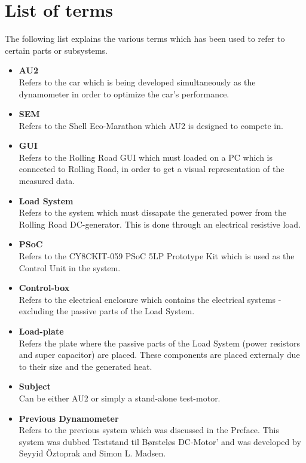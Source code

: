 \section{List of terms}
The following list explains the various terms which has been used to refer to certain parts or subsystems.
\begin{itemize}
	\item \textbf{AU2}\\
	Refers to the car which is being developed simultaneously as the dynamometer in order to optimize the car's performance.
	\item \textbf{SEM}\\
	Refers to the Shell Eco-Marathon which AU2 is designed to compete in.
	\item \textbf{GUI}\\
	Refers to the Rolling Road GUI which must loaded on a PC which is connected to Rolling Road, in order to get a visual representation of the measured data.
	\item \textbf{Load System}\\
	Refers to the system which must dissapate the generated power from the Rolling Road DC-generator. This is done through an electrical resistive load.
	\item \textbf{PSoC}\\
	Refers to the CY8CKIT-059 PSoC 5LP Prototype Kit which is used as the Control Unit in the system.
	\item \textbf{Control-box}\\
	Refers to the electrical enclosure which contains the electrical systems - excluding the passive parts of the Load System. 
	\item \textbf{Load-plate}\\
	Refers the plate where the passive parts of the Load System (power resistors and super capacitor) are placed. These components are placed externaly due to their size and the generated heat.
	\item \textbf{Subject}\\
	Can be either AU2 or simply a stand-alone test-motor.
	\item \textbf{Previous Dynamometer}\\
	Refers to the previous system which was discussed in the Preface. This system was dubbed Teststand til Børsteløs DC-Motor' and was developed by Seyyid Öztoprak and Simon L. Madsen.
\end{itemize}